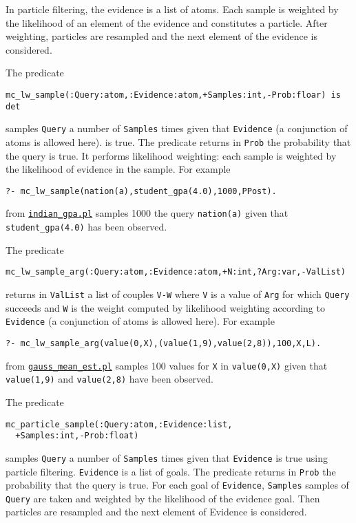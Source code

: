 In particle filtering, the evidence is a list of atoms. Each sample is weighted by the
likelihood of an element of the evidence and constitutes a particle. 
After weighting, particles are resampled and the next element of the evidence
is considered.

 The predicate 
\begin{verbatim}
mc_lw_sample(:Query:atom,:Evidence:atom,+Samples:int,-Prob:floar) is det
\end{verbatim}
samples \verb|Query|  a number of \verb|Samples| times given that \verb|Evidence|
(a conjunction of atoms is allowed here). is true.
The predicate returns in \verb|Prob| the probability that the query is true.
It performs likelihood weighting: each sample is weighted by the
likelihood of evidence in the sample.
For example
\begin{verbatim}
?- mc_lw_sample(nation(a),student_gpa(4.0),1000,PPost).
\end{verbatim}
from \href{http://cplint.lamping.unife.it/example/inference/indian_gpa.pl}{\texttt{indian\_gpa.pl}} samples 1000 the query
\verb|nation(a)| given that \verb|student_gpa(4.0)| has been observed.


 The predicate 
\begin{verbatim}
mc_lw_sample_arg(:Query:atom,:Evidence:atom,+N:int,?Arg:var,-ValList)
\end{verbatim}
returns in \verb|ValList| a list of couples \verb|V-W| where \verb|V| is a value of \verb|Arg| 
for which \verb|Query| succeeds and \verb|W| is the
weight computed by likelihood weighting
according to \verb|Evidence| (a conjunction of atoms is allowed here).
For example
\begin{verbatim}
?- mc_lw_sample_arg(value(0,X),(value(1,9),value(2,8)),100,X,L).
\end{verbatim}
from \href{http://cplint.lamping.unife.it/example/inference/gauss_mean_est.pl}{\texttt{gauss\_mean\_est.pl}} samples 100 values for \verb|X| in
\verb|value(0,X)| given that \verb|value(1,9)| and \verb|value(2,8)| have been observed.

The predicate
\begin{verbatim}
mc_particle_sample(:Query:atom,:Evidence:list,
  +Samples:int,-Prob:float)
\end{verbatim}
samples \verb|Query|  a number of \verb|Samples| times given that 
\verb|Evidence|
is true using particle filtering. \verb|Evidence| is a list of goals.
The predicate returns in \verb|Prob| the probability that the query is true.
For each goal of \verb|Evidence|, \verb|Samples| samples of \verb|Query| are taken
and weighted by the likelihood of the evidence goal.
Then particles are resampled and the next element of Evidence
is considered.

